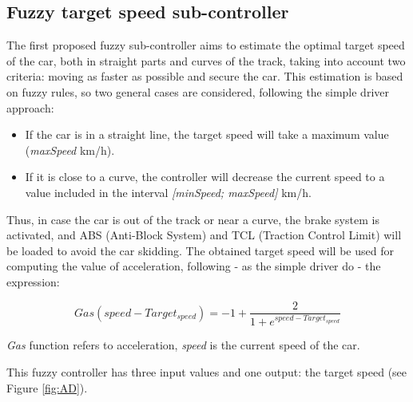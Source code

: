 \documentclass[runningheads,a4paper]{llncs}
\begin{document}
	
	\subsection{Fuzzy target speed sub-controller}
	
	The first proposed fuzzy sub-controller aims to estimate the optimal target speed of the car, both in straight parts and curves of the track, taking into account two criteria: moving as faster as possible and secure the car. This estimation is based on fuzzy rules, so two general cases are considered, following the simple driver approach:
	
	\begin{itemize}
		\item If the car is in a straight line, the target speed will take a maximum value (\textit{maxSpeed} km/h).
		\item If it is close to a curve, the controller will decrease the current speed to a value included in the interval \textit{[minSpeed; maxSpeed]} km/h.
	\end{itemize}
	
	Thus, in case the car is out of the track or near a curve, the brake system is activated, and ABS (Anti-Block System) and TCL (Traction Control Limit) will be loaded to avoid the car skidding. The obtained target speed will be used for computing the value of acceleration, following - as the simple driver do - the expression:
	
	\begin{equation}	
	Gas(speed-Target_{speed})=-1+\frac{2}{1+e^{speed-Target_{speed}}}	
	\end{equation}
	
	\textit{Gas} function refers to acceleration, \textit{speed} is the current speed of the car.
	
	This fuzzy controller has three input values and one output: the target speed (see Figure \ref{fig:AD}).
	
\end{document}

